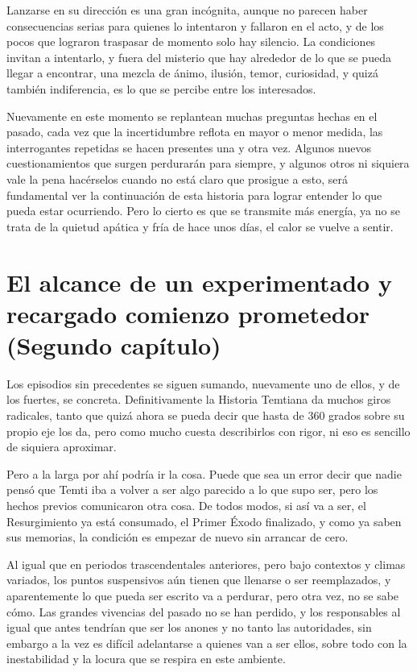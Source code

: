 \documentclass[
  spanish,
]{book}
\begin{document}
Lanzarse en su dirección es una gran incógnita, aunque no parecen haber consecuencias serias para quienes lo intentaron y fallaron en el acto, y de los pocos que lograron traspasar de momento solo hay silencio. La condiciones invitan a intentarlo, y fuera del misterio que hay alrededor de lo que se pueda llegar a encontrar, una mezcla de ánimo, ilusión, temor, curiosidad, y quizá también indiferencia, es lo que se percibe entre los interesados.

Nuevamente en este momento se replantean muchas preguntas hechas en el pasado, cada vez que la incertidumbre reflota en mayor o menor medida, las interrogantes repetidas se hacen presentes una y otra vez. Algunos nuevos cuestionamientos que surgen perdurarán para siempre, y algunos otros ni siquiera vale la pena hacérselos cuando no está claro que prosigue a esto, será fundamental ver la continuación de esta historia para lograr entender lo que pueda estar ocurriendo. Pero lo cierto es que se transmite más energía, ya no se trata de la quietud apática y fría de hace unos días, el calor se vuelve a sentir.

\hypertarget{el-alcance-de-un-experimentado-y-recargado-comienzo-prometedor-segundo-capuxedtulo}{%
\chapter{El alcance de un experimentado y recargado comienzo prometedor (Segundo capítulo)}\label{el-alcance-de-un-experimentado-y-recargado-comienzo-prometedor-segundo-capuxedtulo}}

Los episodios sin precedentes se siguen sumando, nuevamente uno de ellos, y de los fuertes, se concreta. Definitivamente la Historia Temtiana da muchos giros radicales, tanto que quizá ahora se pueda decir que hasta de 360 grados sobre su propio eje los da, pero como mucho cuesta describirlos con rigor, ni eso es sencillo de siquiera aproximar.

Pero a la larga por ahí podría ir la cosa. Puede que sea un error decir que nadie pensó que Temti iba a volver a ser algo parecido a lo que supo ser, pero los hechos previos comunicaron otra cosa. De todos modos, si así va a ser, el Resurgimiento ya está consumado, el Primer Éxodo finalizado, y como ya saben sus memorias, la condición es empezar de nuevo sin arrancar de cero.

Al igual que en periodos trascendentales anteriores, pero bajo contextos y climas variados, los puntos suspensivos aún tienen que llenarse o ser reemplazados, y aparentemente lo que pueda ser escrito va a perdurar, pero otra vez, no se sabe cómo. Las grandes vivencias del pasado no se han perdido, y los responsables al igual que antes tendrían que ser los anones y no tanto las autoridades, sin embargo a la vez es difícil adelantarse a quienes van a ser ellos, sobre todo con la inestabilidad y la locura que se respira en este ambiente.
\end{document}
